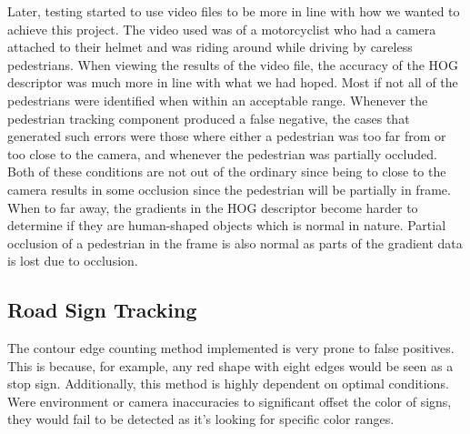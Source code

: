 Later, testing started to use video files to be more in line with how we wanted to achieve this project. The video used was of a motorcyclist who had a camera attached to their helmet and was riding around while driving by careless pedestrians. When viewing the results of the video file, the accuracy of the HOG descriptor was much more in line with what we had hoped. Most if not all of the pedestrians were identified when within an acceptable range. Whenever the pedestrian tracking component produced a false negative, the cases that generated such errors were those where either a pedestrian was too far from or too close to the camera, and whenever the pedestrian was partially occluded. Both of these conditions are not out of the ordinary since being to close to the camera results in some occlusion since the pedestrian will be partially in frame. When to far away, the gradients in the HOG descriptor become harder to determine if they are human-shaped objects which is normal in nature. Partial occlusion of a pedestrian in the frame is also normal as parts of the gradient data is lost due to occlusion.

\subsection{Road Sign Tracking}

The contour edge counting method implemented is very prone to false positives.
This is because, for example, any red shape with eight edges would be seen as a stop sign.
Additionally, this method is highly dependent on optimal conditions.
Were environment or camera inaccuracies to significant offset the color of signs, they would fail to be detected as it's looking for specific color ranges.

